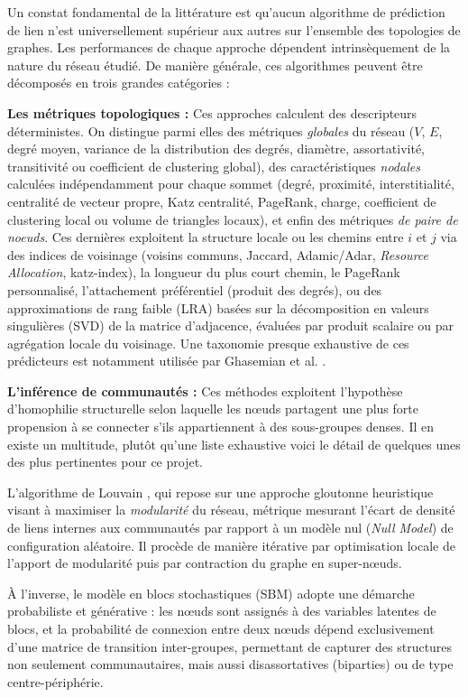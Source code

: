 Un constat fondamental de la littérature est qu'aucun algorithme de prédiction de lien n'est universellement supérieur aux autres sur l'ensemble des topologies de graphes. Les performances de chaque approche dépendent intrinsèquement de la nature du réseau étudié. De manière générale, ces algorithmes peuvent être décomposés en trois grandes catégories :

\textbf{Les métriques topologiques :} Ces approches calculent des descripteurs déterministes. On distingue parmi elles des métriques \textit{globales} du réseau ($V$, $E$, degré moyen, variance de la distribution des degrés, diamètre, assortativité, transitivité ou coefficient de clustering global), des caractéristiques \textit{nodales} calculées indépendamment pour chaque sommet (degré, proximité, interstitialité, centralité de vecteur propre, Katz centralité, PageRank, charge, coefficient de clustering local ou volume de triangles locaux), et enfin des métriques \textit{de paire de noeuds}. Ces dernières exploitent la structure locale ou les chemins entre $i$ et $j$ via des indices de voisinage (voisins communs, Jaccard, Adamic/Adar, \textit{Resource Allocation}, katz-index\cite{katz1953}), la longueur du plus court chemin, le PageRank personnalisé, l'attachement préférentiel (produit des degrés), ou des approximations de rang faible (LRA) basées sur la décomposition en valeurs singulières (SVD) de la matrice d'adjacence, évaluées par produit scalaire ou par agrégation locale du voisinage. Une taxonomie presque exhaustive de ces prédicteurs est notamment utilisée par Ghasemian et al. \cite{01stackingLinkPred}.
    
\textbf{L'inférence de communautés :} Ces méthodes exploitent l'hypothèse d'homophilie structurelle selon laquelle les nœuds partagent une plus forte propension à se connecter s'ils appartiennent à des sous-groupes denses. Il en existe un multitude, plutôt qu'une liste exhaustive voici le détail de quelques unes des plus pertinentes pour ce projet.

L'algorithme de Louvain \cite{louvain2008}, qui repose sur une approche gloutonne heuristique visant à maximiser la \textit{modularité} du réseau, métrique mesurant l'écart de densité de liens internes aux communautés par rapport à un modèle nul (\textit{Null Model}) de configuration aléatoire. Il procède de manière itérative par optimisation locale de l'apport de modularité puis par contraction du graphe en super-nœuds. 

À l'inverse, le modèle en blocs stochastiques (SBM) \cite{sbm1983} adopte une démarche probabiliste et générative : les nœuds sont assignés à des variables latentes de blocs, et la probabilité de connexion entre deux nœuds dépend exclusivement d'une matrice de transition inter-groupes, permettant de capturer des structures non seulement communautaires, mais aussi disassortatives (biparties) ou de type centre-périphérie. 

